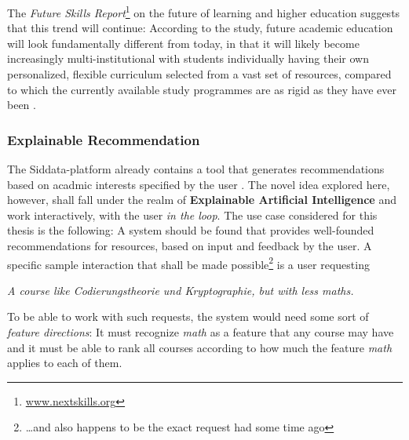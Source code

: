 The \emph{Future Skills Report}\footnote{\url{www.nextskills.org}} on the future of learning and higher education \cite{Ehlers2019} suggests that this trend will continue: According to the study, future academic education will look fundamentally different from today, in that it will likely become increasingly multi-institutional with students individually having their own personalized, flexible curriculum selected from a vast set of resources, compared to which the currently available study programmes are as rigid as they have ever been \cite{Ehlers2019}.

\subsubsection*{Explainable Recommendation}

The Siddata-platform already contains a tool that generates recommendations based on acadmic interests specified by the user \cite{Schurz2021}. The novel idea explored here, however, shall fall under the realm of \textbf{Explainable Artificial Intelligence} and work interactively, with the user \textit{in the loop}. The use case considered for this thesis is the following: A system should be found that provides well-founded recommendations for resources, based on input and feedback by the user. A specific sample interaction that shall be made possible\footnote{\dots and also happens to be the exact request \me had some time ago} is a user requesting 
\begin{displayquote}
	\textit{\guillemotright A course like \emph{Codierungstheorie und Kryptographie}, but with less maths.\guillemotleft}
\end{displayquote}

To be able to work with such requests, the system would need some sort of \textit{feature directions}: It must recognize \emph{math} as a feature that any course may have and it must be able to rank all courses according to how much the feature \emph{math} applies to each of them.


\label{sec:amazonalgo}

